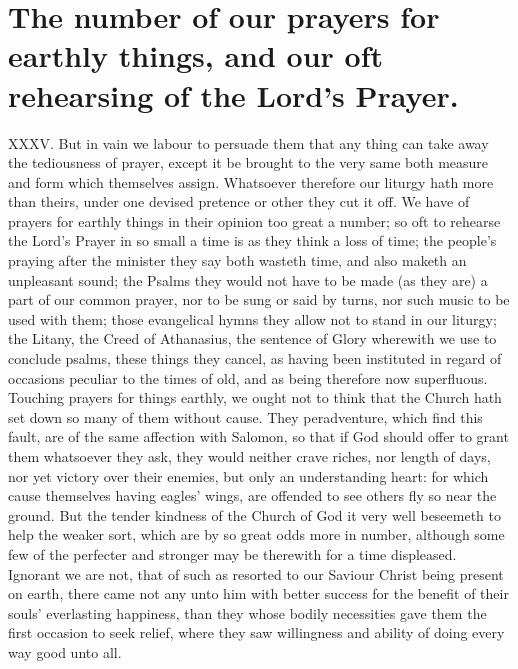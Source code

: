\section*{The number of our prayers for earthly things, and our oft rehearsing of the Lord’s Prayer.}
XXXV. But in vain we labour to persuade them that any thing can take away the tediousness of prayer, except it be brought to the very same both measure and form which themselves assign. Whatsoever therefore our liturgy hath more than theirs, under one devised pretence or other they cut it off. We have of prayers for earthly things in their opinion too great a number; so oft to rehearse the Lord’s Prayer in so small a time is as they think a loss of time; the people’s praying after the minister they say both wasteth time, and also maketh an unpleasant sound; the Psalms they would not have to be made (as they are) a part of our common prayer, nor to be sung or said by turns, nor such music to be used with them; those evangelical hymns they allow not to stand in our liturgy; the Litany, the Creed of Athanasius, the sentence of Glory wherewith we use to conclude psalms, these things they cancel, as having been instituted  in regard of occasions peculiar to the times of old, and as being therefore now superfluous.
Touching prayers for things earthly, we ought not to think that the Church hath set down so many of them without cause. They peradventure, which find this fault, are of the same affection with Salomon, so that if God should offer to grant them whatsoever they ask, they would neither crave riches, nor length of days, nor yet victory over their enemies, but only an understanding heart: for which cause themselves having eagles’ wings, are offended to see others fly so near the ground. But the tender kindness of the Church of God it very well beseemeth to help the weaker sort, which are by so great odds more in number, although some few of the perfecter and stronger may be therewith for a time displeased.
Ignorant we are not, that of such as resorted to our Saviour Christ being present on earth, there came not any unto him with better success for the benefit of their souls’ everlasting happiness, than they whose bodily necessities gave them the first occasion to seek relief, where they saw willingness and ability of doing every way good unto all.

